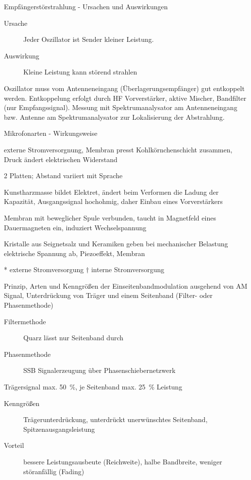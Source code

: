 \documentclass[avery5371,grid,frame,a4paper]{flashcards}
\newcommand{\card}[3]{
  \begin{flashcard}[{\chap} -- #1]{#2}#3\end{flashcard}
}
\begin{document}
\card{43}{Empfängerstörstrahlung - Ursachen und Auswirkungen}{
  \begin{description}
    \item[Ursache]
      Jeder Oszillator ist Sender kleiner Leistung.
    \item[Auswirkung]
      Kleine Leistung kann störend strahlen
  \end{description}

  Oszillator muss vom Antenneneingang (Überlagerungsempfänger) gut entkoppelt werden.
  Entkoppelung erfolgt durch HF Vorverstärker, aktive Mischer, Bandfilter (nur Empfangssignal).
  Messung mit Spektrumanalysator am Antenneneingang bzw. Antenne am Spektrumanalysator zur Lokalisierung der Abstrahlung.
}
\card{44}{Mikrofonarten - Wirkungsweise}{
  \scriptsize
  \begin{description}[itemsep=-3pt,topsep=0pt]
    \item[Kohlemikrofon*]
      externe Stromversorgnung,
      Membran presst Kohlkörnchenschicht zusammen,
      Druck ändert elektrischen Widerstand
    \item[Kondensatormikrofon*]
      2 Platten; Abstand variiert mit Sprache
    \item[Elektretmikrofon*]
      Kunstharzmasse bildet Elektret, ändert beim Verformen die Ladung der Kapazität,
      Ausgangssignal hochohmig, daher Einbau eines Vorverstärkers
    \item[Dynamisches Mikrofon$^\dagger$]
      Membran mit beweglicher Spule verbunden,
      taucht in Magnetfeld eines Dauermagneten ein,
      induziert Wechselspannung 
    \item[Kristallmikrofon$^\dagger$]
      Kristalle aus Seignetsalz und Keramiken geben bei mechanischer Belastung elektrische Spannung ab,
      Piezoeffekt, Membran
  \end{description}%
  * \quad externe Stromversorgung \qquad
  $\dagger$ \quad interne Stromversorgung
}
\card{45}{Prinzip, Arten und Kenngrößen der Einseitenbandmodulation}{
  \footnotesize
  ausgehend von AM Signal,
  Unterdrückung von Träger und einem Seitenband (Filter- oder Phasenmethode)

  \begin{description}
    \item[Filtermethode] Quarz lässt nur Seitenband durch
    \item[Phasenmethode] SSB Signalerzeugung über Phasenschiebernetzwerk
  \end{description}

  Trägersignal max. \SI{50}{\percent}, je Seitenband max. \SI{25}{\percent} Leistung

  \begin{description}
    \item[Kenngrößen] Trägerunterdrückung, unterdrückt unerwünschtes Seitenband, Spitzenausgangsleistung
    \item[Vorteil] bessere Leistungsausbeute (Reichweite), halbe Bandbreite, weniger störanfällig (Fading)
  \end{description}
}
\end{document}
